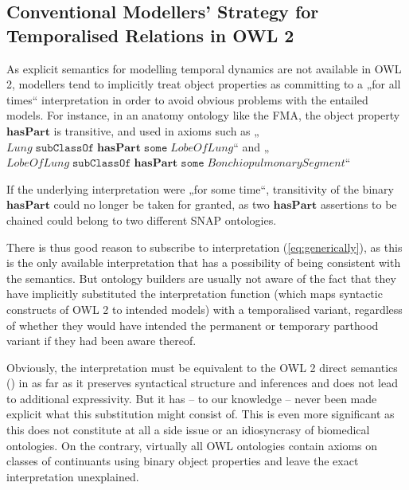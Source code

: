 \documentclass{ao2e}
\newcommand{\mirel}[1]{\ensuremath{\mathrm{\mathbf{#1}}}}
\newcommand{\mclass}[1]{\ensuremath{\mathit{#1}}}
\begin{document}
\subsection{Conventional Modellers’ Strategy for Temporalised Relations in OWL 2}

As explicit semantics for modelling temporal dynamics are not available in OWL
2, modellers tend to implicitly treat object properties as committing to a 
„for all times“ interpretation in order to avoid obvious problems with the
entailed models. For instance, in an anatomy ontology like the FMA, the object
property \mirel{hasPart} is transitive, and used in axioms such as
„$\mclass{Lung}\;\mathtt{subClassOf}\;\mirel{hasPart}\;\mathtt{some}\;\mclass{LobeOfLung}$“
and „$\mclass{LobeOfLung}\;\mathtt{subClassOf}\;\mirel{hasPart}\;\mathtt{some}\;\mclass{BonchiopulmonarySegment}$“

If the underlying interpretation were „for some time“, transitivity of the
binary \mirel{hasPart} could no longer be taken for granted, as two
\mirel{hasPart} assertions to be chained could belong to two different SNAP
ontologies.

There is thus good reason to subscribe to interpretation (\ref{eq:generically}),
as this is the only available interpretation that has a possibility of being
consistent with the semantics. But ontology builders are usually not aware of
the fact that they have implicitly substituted the interpretation function
(which maps syntactic constructs of OWL 2 to intended models) with a
temporalised variant, regardless of whether they would have intended the
permanent or temporary parthood variant if they had been aware thereof.

Obviously, the interpretation must be equivalent to the OWL 2 direct semantics
(\cite{OWL2:direct}) in as far as it preserves syntactical structure and inferences and does not
lead to additional expressivity. But it has – to our knowledge – never been made
explicit what this substitution might consist of.  This is even more significant
as this does not constitute at all a side issue or an idiosyncrasy of biomedical
ontologies. On the contrary, virtually all OWL ontologies contain axioms on
classes of continuants using binary object properties and leave the exact
interpretation unexplained. 
\end{document}
